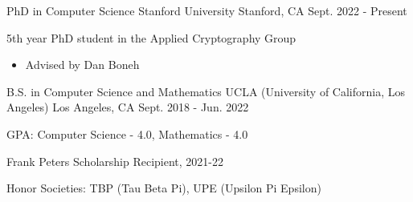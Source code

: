 

\begin{cventries}

\cventry
    {PhD in Computer Science} %
    {Stanford University} %
    {Stanford, CA} %
    {Sept. 2022 - Present} %
    {
      \begin{cvitems} %
        \item {5th year PhD student in the Applied Cryptography Group}
        \begin{itemize}
          \item{Advised by Dan Boneh}
        \end{itemize}
      \end{cvitems}
    }

  \cventry
    {B.S. in Computer Science and Mathematics} %
    {UCLA (University of California, Los Angeles)} %
    {Los Angeles, CA} %
    {Sept. 2018 - Jun. 2022} %
    {
      \begin{cvitems} %
        \item {GPA: Computer Science - 4.0, Mathematics - 4.0}
        \item {Frank Peters Scholarship Recipient, 2021-22}
        \item{Honor Societies: TBP (Tau Beta Pi), UPE (Upsilon Pi Epsilon)}
      \end{cvitems}
    }

\end{cventries}
